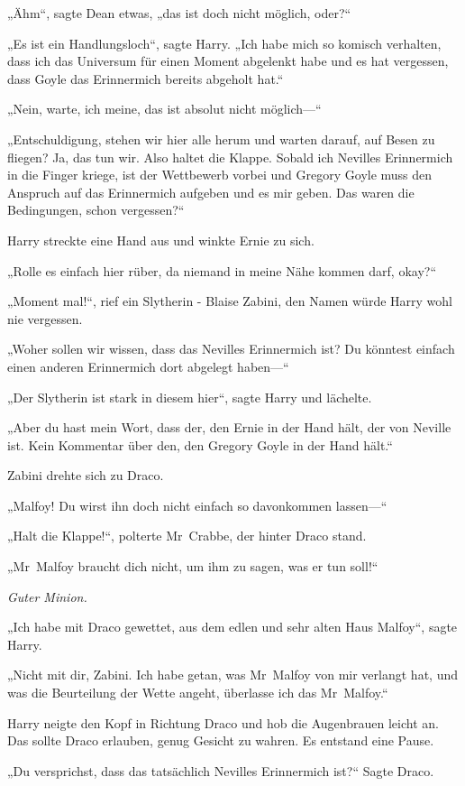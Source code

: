 {„Ähm“, sagte Dean etwas, „das ist doch nicht möglich, oder?“

„Es ist ein Handlungsloch“, sagte Harry. „Ich habe mich so komisch verhalten, dass ich das Universum für einen Moment abgelenkt habe und es hat vergessen, dass Goyle das Erinnermich bereits abgeholt hat.“

„Nein, warte, ich meine, das ist absolut nicht möglich—“

„Entschuldigung, stehen wir hier alle herum und warten darauf, auf Besen zu fliegen? Ja, das tun wir. Also haltet die Klappe. Sobald ich Nevilles Erinnermich in die Finger kriege, ist der Wettbewerb vorbei und Gregory Goyle muss den Anspruch auf das Erinnermich aufgeben und es mir geben. Das waren die Bedingungen, schon vergessen?“

Harry streckte eine Hand aus und winkte Ernie zu sich.

„Rolle es einfach hier rüber, da niemand in meine Nähe kommen darf, okay?“

„Moment mal!“, rief ein Slytherin - Blaise Zabini, den Namen würde Harry wohl nie vergessen.

„Woher sollen wir wissen, dass das Nevilles Erinnermich ist? Du könntest einfach einen anderen Erinnermich dort abgelegt haben—“

„Der Slytherin ist stark in diesem hier“, sagte Harry und lächelte.

„Aber du hast mein Wort, dass der, den Ernie in der Hand hält, der von Neville ist. Kein Kommentar über den, den Gregory Goyle in der Hand hält.“

Zabini drehte sich zu Draco.

„Malfoy! Du wirst ihn doch nicht einfach so davonkommen lassen—“

„Halt die Klappe!“, polterte Mr~Crabbe, der hinter Draco stand.

„Mr~Malfoy braucht dich nicht, um ihm zu sagen, was er tun soll!“

\emph{Guter Minion.}

„Ich habe mit Draco gewettet, aus dem edlen und sehr alten Haus Malfoy“, sagte Harry.

„Nicht mit dir, Zabini. Ich habe getan, was Mr~Malfoy von mir verlangt hat, und was die Beurteilung der Wette angeht, überlasse ich das Mr~Malfoy.“

Harry neigte den Kopf in Richtung Draco und hob die Augenbrauen leicht an. Das sollte Draco erlauben, genug Gesicht zu wahren. Es entstand eine Pause.

„Du versprichst, dass das tatsächlich Nevilles Erinnermich ist?“ Sagte Draco.

}
